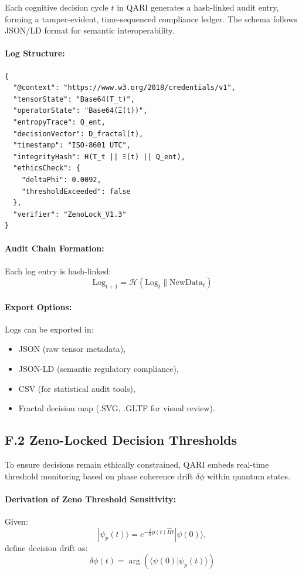 \documentclass[12pt]{article}
\begin{document}
\begin{itemize}
Each cognitive decision cycle \( t \) in QARI generates a hash-linked audit entry, forming a tamper-evident, time-sequenced compliance ledger. The schema follows JSON/LD format for semantic interoperability.

\paragraph{Log Structure:}
\begin{verbatim}
{
  "@context": "https://www.w3.org/2018/credentials/v1",
  "tensorState": "Base64(T_t)",
  "operatorState": "Base64(Ξ(t))",
  "entropyTrace": Q_ent,
  "decisionVector": D_fractal(t),
  "timestamp": "ISO-8601 UTC",
  "integrityHash": H(T_t || Ξ(t) || Q_ent),
  "ethicsCheck": {
    "deltaPhi": 0.0092,
    "thresholdExceeded": false
  },
  "verifier": "ZenoLock_V1.3"
}
\end{verbatim}

\paragraph{Audit Chain Formation:}
Each log entry is hash-linked:
\[
\text{Log}_{t+1} = \mathcal{H}(\text{Log}_t \| \text{NewData}_t)
\]

\paragraph{Export Options:}
Logs can be exported in:
\begin{itemize}
    \item JSON (raw tensor metadata),
    \item JSON-LD (semantic regulatory compliance),
    \item CSV (for statistical audit tools),
    \item Fractal decision map (.SVG, .GLTF for visual review).
\end{itemize}

\subsection*{F.2 Zeno-Locked Decision Thresholds}

To ensure decisions remain ethically constrained, QARI embeds real-time threshold monitoring based on phase coherence drift \( \delta\phi \) within quantum states.

\paragraph{Derivation of Zeno Threshold Sensitivity:}
Given:
\[
|\psi_p(t)\rangle = e^{-\frac{i}{\hbar} p(t) \hat{H} t} |\psi(0)\rangle,
\]
define decision drift as:
\[
\delta\phi(t) = \arg(\langle \psi(0) | \psi_p(t) \rangle)
\]


\end{itemize}
\end{document}

